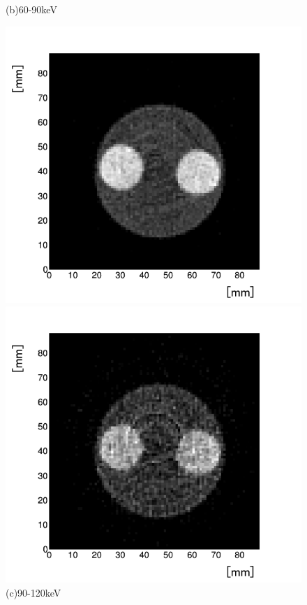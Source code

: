 \begin{figure}[H]
\begin{minipage}{0.5\hsize}
\begin{center}
  \end{center}
\vspace{-1cm}
\caption*{(b)60-90keV}
 \end{minipage}
 \begin{minipage}{0.5\hsize}
  \begin{center}
   \includegraphics[bb=0.000000 0.000000 314.853972 293.735718,width=1.0\hsize]{image2/chapter5/BH_90-120.png}
  \end{center}  
\vspace{-1cm}
\caption*{(c)90-120keV}
 \end{minipage}
 \begin{minipage}{0.5\hsize}
  \begin{center}
   \includegraphics[bb=0.000000 0.000000 314.853972 293.735718,width=1.0\hsize]{image2/chapter5/BH_120-150.png}

\end{center}
\end{minipage}
\end{figure}
